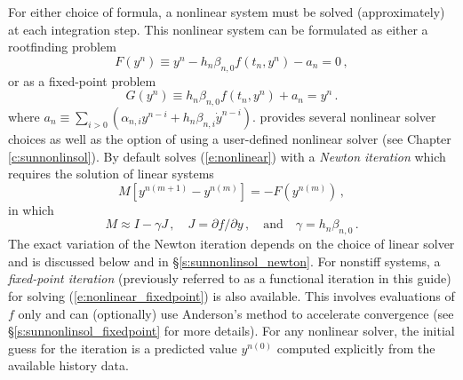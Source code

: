 For either choice of formula, a nonlinear system must be solved (approximately)
at each integration step. This nonlinear system can be formulated as
either a rootfinding problem
\begin{equation}\label{e:nonlinear}
  F(y^n) \equiv y^n - h_n \beta_{n,0} f(t_n,y^n) - a_n = 0 \, ,
\end{equation}
or as a fixed-point problem
\begin{equation}\label{e:nonlinear_fixedpoint}
  G(y^n) \equiv h_n \beta_{n,0} f(t_n,y^n) + a_n = y^n \, .
\end{equation}
where $a_n\equiv\sum_{i>0}(\alpha_{n,i}y^{n-i}+h_n\beta_{n,i} {\dot{y}}^{n-i})$.
{\cvodes} provides several nonlinear solver choices as well as the option of
using a user-defined nonlinear solver (see Chapter \ref{c:sunnonlinsol}). By
default {\cvodes} solves (\ref{e:nonlinear}) with a \textit{Newton iteration}
which requires the solution of linear systems
\begin{equation}\label{e:Newton}
  M [y^{n(m+1)} - y^{n(m)}] = -F(y^{n(m)}) \, ,
\end{equation}
in which
\begin{equation}\label{e:Newtonmat}
  M \approx I - \gamma J \, ,
  \quad J = \partial f / \partial y \, ,
  \quad \mbox{and} \quad
  \gamma = h_n \beta_{n,0} \, .
\end{equation}
The exact variation of the Newton iteration depends on the choice of linear
solver and is discussed below and in \S\ref{s:sunnonlinsol_newton}. For nonstiff
systems, a \textit{fixed-point iteration} (previously referred
to as a functional iteration in this guide) for solving
(\ref{e:nonlinear_fixedpoint}) is also available. This involves evaluations of
$f$ only and can (optionally) use Anderson's method \cite{Anderson65,
Walker-Ni09, Fang-Saad09, LWWY11} to accelerate convergence (see
\S\ref{s:sunnonlinsol_fixedpoint} for more details). For any nonlinear solver,
the initial guess for the iteration is a predicted value $y^{n(0)}$ computed
explicitly from the available history data.

